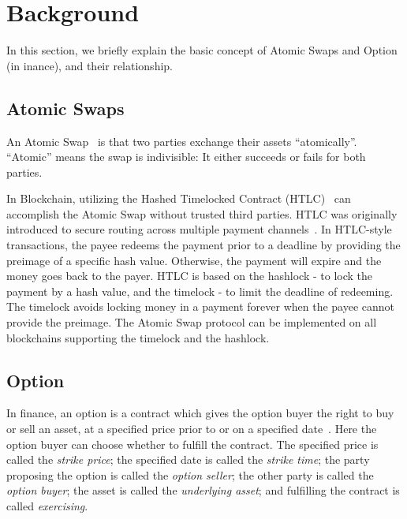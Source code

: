 \section{Background}
\label{sec:background}

In this section, we briefly explain the basic concept of Atomic Swaps and Option (in inance), and their relationship.

\subsection{Atomic Swaps}

An Atomic Swap~\cite{nolan2013alt} is that two parties exchange their assets ``atomically''.
``Atomic'' means the swap is indivisible: It either succeeds or fails for both parties.

In Blockchain, utilizing the Hashed Timelocked Contract (HTLC)~\cite{poon2016bitcoin} can accomplish the Atomic Swap without trusted third parties. HTLC was originally introduced to secure routing across multiple payment channels~\cite{paychannel2018btcwiki}.
In HTLC-style transactions, the payee redeems the payment prior to a deadline by providing the preimage of a specific hash value.
Otherwise, the payment will expire and the money goes back to the payer.
HTLC is based on the hashlock - to lock the payment by a hash value, and the timelock - to limit the deadline of redeeming. The timelock avoids locking money in a payment forever when the payee cannot provide the preimage.
The Atomic Swap protocol can be implemented on all blockchains supporting the timelock and the hashlock.


\subsection{Option}
\label{subsec:background_option}

In finance, an option is a contract which gives the option buyer the right to buy or sell an asset, at a specified price prior to or on a specified date~\cite{higham2004introduction}.
Here the option buyer can choose whether to fulfill the contract.
The specified price is called the \textit{strike price};
the specified date is called the \textit{strike time};
the party proposing the option is called the \textit{option seller};
the other party is called the \textit{option buyer};
the asset is called the \textit{underlying asset};
and fulfilling the contract is called \textit{exercising}.

